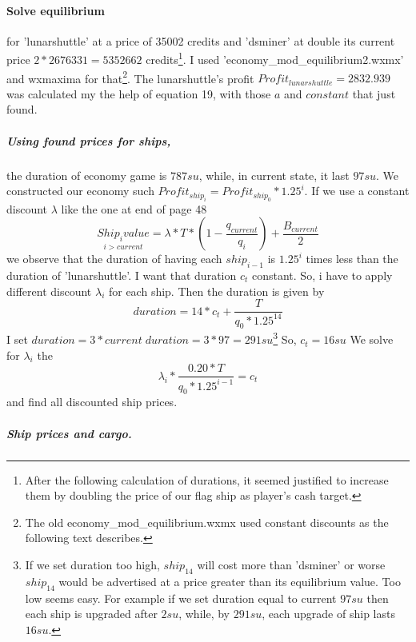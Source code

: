 \documentclass[]{article}
\begin{document}
\paragraph{Solve equilibrium} for 'lunarshuttle' at a price of 35002 credits and 'dsminer' at double its current price $2*2676331=5352662$ credits\footnote{After the following calculation of durations, it seemed justified to increase them by doubling the price of our flag ship as player's cash target.}. I used 'economy\_mod\_equilibrium2.wxmx' and wxmaxima for that\footnote{The old economy\_mod\_equilibrium.wxmx used constant discounts as the following text describes.}. The lunarshuttle's profit $Profit_{lunarshuttle}=2832.939$ was calculated my the help of equation 19, with those $a$ and $constant$ that just found.
\subparagraph*{Using found prices for ships,} the duration of economy game is $787su$, while, in current state, it last $97su$. We constructed our economy such $Profit_{ship_{i}}=Profit_{ship_{0}}*1.25^{i}$. If we use a constant discount $\lambda$ like the one at end of page 48 
\[\underset{i > current}{Ship_{i}value}=\lambda*T*(1-\dfrac{q_{current}}{q_{i}})+\dfrac{B_{current}}{2}\]
we observe that the duration of having each $ship_{i-1}$ is $1.25^i$ times less than the duration of 'lunarshuttle'. I want that duration $c_t$ constant. So, i have to apply different discount $\lambda_i$ for each ship.
Then the duration is given by \[duration=14*c_t +\dfrac{T}{q_{0}*1.25^{14}}\] I set $duration=3*current\;duration=3*97=291su$\footnote{If we set duration too high, $ship_{14}$ will cost more than 'dsminer' or worse $ship_{14}$ would be advertised at a price greater than its equilibrium value. Too low seems easy. For example if we set duration equal to current $97su$ then each ship is upgraded after $2su$, while, by $291su$, each upgrade of ship lasts $16su$.} So, $c_{t}= 16su$ We solve for $\lambda_i$ the
\[\lambda_i*\dfrac{0.20*T}{q_0*1.25^{i-1}}=c_t\] and  find all discounted ship prices.
\subparagraph{Ship prices and cargo.}
\end{document}

